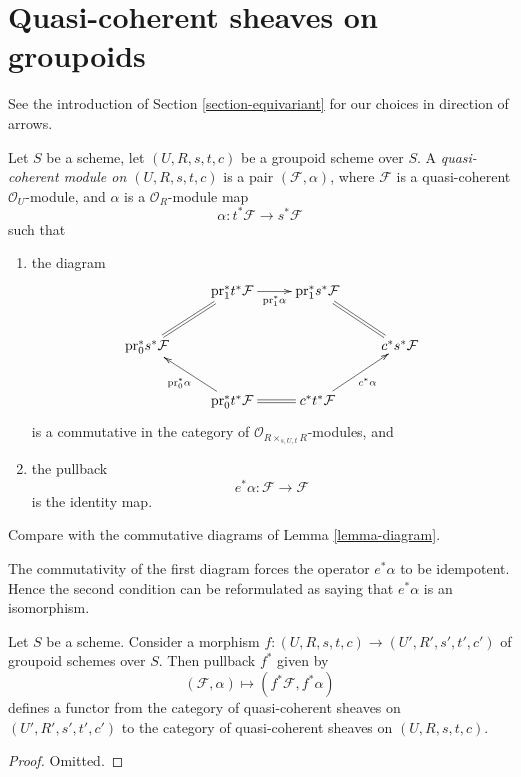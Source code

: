 \section{Quasi-coherent sheaves on groupoids}
\label{section-groupoids-quasi-coherent}

\noindent
See the introduction of Section \ref{section-equivariant} for our
choices in direction of arrows.

\begin{definition}
\label{definition-groupoid-module}
Let $S$ be a scheme, let $(U, R, s, t, c)$ be a groupoid scheme over $S$.
A {\it quasi-coherent module on $(U, R, s, t, c)$}
is a pair $(\mathcal{F}, \alpha)$, where $\mathcal{F}$ is a quasi-coherent
$\mathcal{O}_U$-module, and $\alpha$ is a $\mathcal{O}_R$-module
map
$$
\alpha : t^*\mathcal{F} \longrightarrow s^*\mathcal{F}
$$
such that
\begin{enumerate}
\item the diagram
$$
\xymatrix{
& \text{pr}_1^*t^*\mathcal{F} \ar[r]_-{\text{pr}_1^*\alpha} &
\text{pr}_1^*s^*\mathcal{F} \ar@{=}[rd] & \\
\text{pr}_0^*s^*\mathcal{F} \ar@{=}[ru] & & & c^*s^*\mathcal{F} \\
& \text{pr}_0^*t^*\mathcal{F} \ar[lu]^{\text{pr}_0^*\alpha} \ar@{=}[r] &
c^*t^*\mathcal{F} \ar[ru]_{c^*\alpha}
}
$$
is a commutative in the category of
$\mathcal{O}_{R \times_{s, U, t} R}$-modules, and
\item the pullback
$$
e^*\alpha : \mathcal{F} \longrightarrow \mathcal{F}
$$
is the identity map.
\end{enumerate}
Compare with the commutative diagrams of Lemma \ref{lemma-diagram}.
\end{definition}

\noindent
The commutativity of the first diagram forces the operator $e^*\alpha$
to be idempotent. Hence the second condition can be reformulated as saying
that $e^*\alpha$ is an isomorphism.

\begin{lemma}
\label{lemma-pullback}
Let $S$ be a scheme. Consider a morphism
$f : (U, R, s, t, c) \to (U', R', s', t', c')$
of groupoid schemes over $S$. Then pullback $f^*$ given by
$$
(\mathcal{F}, \alpha) \mapsto (f^*\mathcal{F}, f^*\alpha)
$$
defines a functor from the category of quasi-coherent sheaves on
$(U', R', s', t', c')$ to the category of quasi-coherent sheaves on
$(U, R, s, t, c)$.
\end{lemma}

\begin{proof}
Omitted.
\end{proof}






